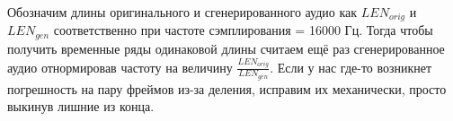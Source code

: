 \documentclass[../diploma.tex]{subfiles}
\begin{document}
Обозначим длины оригинального и сгенерированного аудио как $LEN_{orig}$ и $LEN_{gen}$ соответственно при частоте сэмплирования  =  16000 Гц. Тогда чтобы получить временные ряды одинаковой длины считаем ещё раз сгенерированное аудио отнормировав частоту на величину $\frac{LEN_{orig}}{LEN_{gen}}$. Если у нас где-то возникнет погрешность на пару фреймов из-за деления, исправим их механически, просто выкинув лишние из конца.
\end{document}
